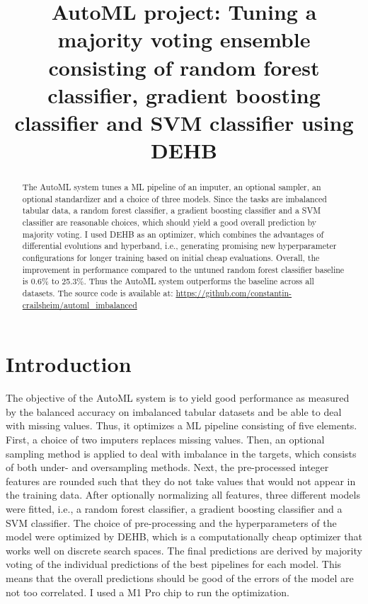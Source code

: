 \documentclass[11pt]{article}
\title{AutoML project: Tuning a majority voting ensemble consisting of random forest classifier, gradient boosting classifier and SVM classifier using DEHB}
\author[1]{\nameemail{Constantin von Crailsheim}{C.Crailsheim@campus.lmu.de}}
\affil[1]{LMU Munich, Institute of Statistics}
\begin{document}
\maketitle

\begin{abstract}
The AutoML system tunes a ML pipeline of an imputer, an optional sampler, an optional standardizer and a choice of three models. Since the tasks are imbalanced tabular data, a random forest classifier, a gradient boosting classifier and a SVM classifier are reasonable choices, which should yield a good overall prediction by majority voting. I used DEHB as an optimizer, which combines the advantages of differential evolutions and hyperband, i.e., generating promising new hyperparameter configurations for longer training based on initial cheap evaluations. Overall, the improvement in performance compared to the untuned random forest classifier baseline is 0.6\% to 25.3\%. Thus the AutoML system outperforms the baseline across all datasets. The source code is available at: \newline \url{https://github.com/constantin-crailsheim/automl_imbalanced}
\end{abstract}



\section{Introduction}

The objective of the AutoML system is to yield good performance as measured by the balanced accuracy on imbalanced tabular datasets and be able to deal with missing values. Thus, it optimizes a ML pipeline consisting of five elements. First, a choice of two imputers replaces missing values. Then, an optional sampling method is applied to deal with imbalance in the targets, which consists of both under- and oversampling methods. Next, the pre-processed integer features are rounded such that they do not take values that would not appear in the training data. After optionally normalizing all features, three different models were fitted, i.e., a random forest classifier, a gradient boosting classifier and a SVM classifier. The choice of pre-processing and the hyperparameters of the model were optimized by DEHB, which is a computationally cheap optimizer that works well on discrete search spaces. The final predictions are derived by majority voting of the individual predictions of the best pipelines for each model. This means that the overall predictions should be good of the errors of the model are not too correlated. I used a M1 Pro chip to run the optimization.
\end{document}
